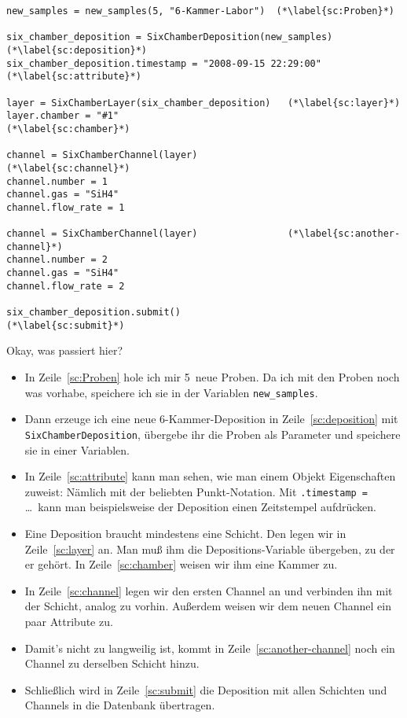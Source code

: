 \documentclass[german,11pt]{article}
\begin{document}
\begin{lstlisting}
new_samples = new_samples(5, "6-Kammer-Labor")  (*\label{sc:Proben}*)

six_chamber_deposition = SixChamberDeposition(new_samples)  (*\label{sc:deposition}*)
six_chamber_deposition.timestamp = "2008-09-15 22:29:00"    (*\label{sc:attribute}*)

layer = SixChamberLayer(six_chamber_deposition)   (*\label{sc:layer}*)
layer.chamber = "#1"                              (*\label{sc:chamber}*)

channel = SixChamberChannel(layer)                (*\label{sc:channel}*)
channel.number = 1
channel.gas = "SiH4"
channel.flow_rate = 1

channel = SixChamberChannel(layer)                (*\label{sc:another-channel}*)
channel.number = 2
channel.gas = "SiH4"
channel.flow_rate = 2

six_chamber_deposition.submit()                   (*\label{sc:submit}*)
\end{lstlisting}

Okay, was passiert hier?

\begin{itemize}
\item In Zeile~\ref{sc:Proben} hole ich mir 5~neue Proben.  Da ich mit den
  Proben noch was vorhabe, speichere ich sie in der Variablen
  \lstinline|new_samples|.
\item Dann erzeuge ich eine neue 6-Kammer-Deposition in
  Zeile~\ref{sc:deposition} mit \lstinline|SixChamberDeposition|, übergebe ihr
  die Proben als Parameter und speichere sie in einer Variablen.
\item In Zeile~\ref{sc:attribute} kann man sehen, wie man einem Objekt
  Eigenschaften zuweist: Nämlich mit der beliebten Punkt-Notation.  Mit
  \lstinline|.timestamp = |…\ kann man beispielsweise der Deposition einen
  Zeitstempel aufdrücken.
\item Eine Deposition braucht mindestens eine Schicht.  Den legen wir in
  Zeile~\ref{sc:layer} an.  Man muß ihm die Depositions-Variable übergeben, zu
  der er gehört.  In Zeile~\ref{sc:chamber} weisen wir ihm eine Kammer zu.
\item In Zeile~\ref{sc:channel} legen wir den ersten Channel an und verbinden
  ihn mit der Schicht, analog zu vorhin.  Außerdem weisen wir dem neuen Channel
  ein paar Attribute zu.
\item Damit's nicht zu langweilig ist, kommt in Zeile~\ref{sc:another-channel}
  noch ein Channel zu derselben Schicht hinzu.
\item Schließlich wird in Zeile~\ref{sc:submit} die Deposition mit allen
  Schichten und Channels in die Datenbank übertragen. 
\end{itemize}
\end{document}
